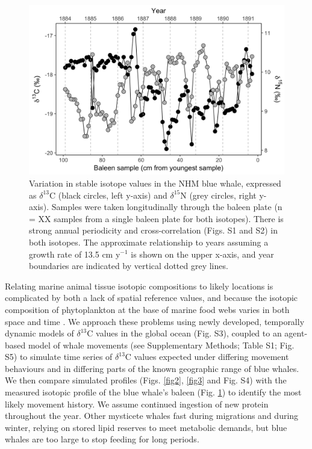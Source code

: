 \documentclass[a4paper,12pt]{article}
\begin{document}
\begin{figure}
  \centering
  \includegraphics[width = \linewidth]{figures/Figure-1-raw-dC-dN-data.png}
  \caption{Variation in stable isotope values in the NHM blue whale, expressed as $\delta^{13}$C (black circles, left y-axis) and $\delta^{15}$N (grey circles, right y-axis). Samples were taken longitudinally through the baleen plate (n = XX samples from a single baleen plate for both isotopes). There is strong annual periodicity and cross-correlation (Figs. S1 and S2) in both isotopes. The approximate relationship to years assuming a growth rate of 13.5 cm y$^{-1}$ is shown on the upper x-axis, and year boundaries are indicated by vertical dotted grey lines.}
  \label{fig1}
\end{figure}

Relating marine animal tissue isotopic compositions to likely locations is complicated by both a lack of spatial reference values, and because the isotopic composition of phytoplankton at the base of marine food webs varies in both space and time \cite{west2006stable,mcmahon2015millennial}.
We approach these problems using newly developed, temporally dynamic models of $\delta^{13}$C values in the global ocean\cite{magozzi2017using} (Fig. S3), coupled to an agent-based model of whale movements (see Supplementary Methods; Table S1; Fig. S5) to simulate time series of $\delta^{13}$C values expected under differing movement behaviours and in differing parts of the known geographic range of blue whales. 
We then compare simulated profiles (Figs. \ref{fig2}, \ref{fig3} and Fig. S4) with the measured isotopic profile of the blue whale's baleen (Fig. \ref{fig1}) to identify the most likely movement history.
We assume continued ingestion of new protein throughout the year. 
Other mysticete whales fast during migrations and during winter, relying on stored lipid reserves to meet metabolic demands, but blue whales are too large to stop feeding for long periods\cite{busquets2017estimating,silva2013north}.
\end{document}
